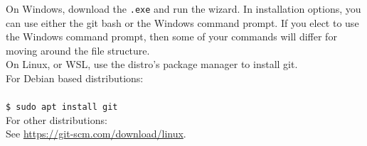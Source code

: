 \documentclass[12pt, letterpaper]{article}
\begin{document}
\noindent On Windows, download the \texttt{.exe} and run the wizard. In installation options, you can use either the git bash or the Windows command prompt. If you elect to use the Windows command prompt, then some of your commands will differ for moving around the file structure. \\[1\baselineskip]

\noindent On Linux, or WSL, use the distro’s package manager to install git. \\[1\baselineskip]

\noindent For Debian based distributions:\\[1\baselineskip]

 \\
\texttt{\$ sudo apt install git} \\[1\baselineskip]

\noindent For other distributions: \\[1\baselineskip]

\noindent See \url{https://git-scm.com/download/linux}. \\[1\baselineskip]
\end{document}
